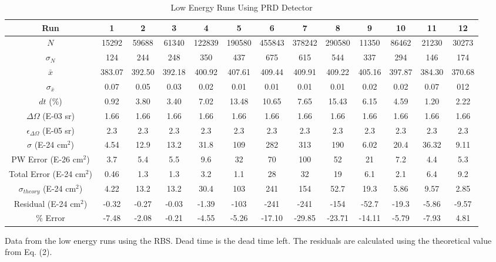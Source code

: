 \documentclass[10pt]{IEEEtran}
\begin{document}
    
    \begin{table}[!hbt]
        \begin{center}
        \caption{Low Energy Runs Using PRD Detector}
        \label{tab:lowPRD}
        \begin{tabular}{|c|cccccccccccc|}
            \hline
		   Run & 1 & 2 & 3 & 4 & 5 & 6 & 7 & 8 & 9 & 10 & 11 & 12 \\ 
		   \hline       \hline     
            $N$ & 15292 & 59688 & 61340 & 122839 & 190580 & 455843 & 378242 & 290580 & 11350 & 86462 & 21230 & 30273 \\
		   \hline  
            $\sigma_N$ & 124 & 244 & 248 & 350 & 437 & 675 & 615 & 544 & 337 & 294 & 146 & 174 \\
            \hline
            $\bar{x}$ & 383.07 & 392.50 & 392.18 & 400.92 & 407.61 & 409.44 & 409.91 & 409.22 & 405.16 & 397.87 & 384.30 & 370.68 \\
            \hline
            $\sigma_{\bar{x}}$ & 0.07 & 0.05 & 0.03 & 0.02 & 0.01 &  0.01 & 0.01 & 0.01 & 0.02 & 0.02 & 0.07 & 012 \\
		   \hline
            $dt$ (\%) & 0.92 & 3.80 & 3.40 & 7.02 & 13.48 & 10.65 & 7.65 & 15.43 & 6.15 & 4.59 & 1.20 & 2.22 \\
			\hline            
			$\Delta\Omega$ (E-03 sr) & 1.66 & 1.66 & 1.66 & 1.66 & 1.66 & 1.66 & 1.66 & 1.66 & 1.66 & 1.66 & 1.66 & 1.66 \\
			\hline
			$\epsilon_{\Delta\Omega}$ (E-05 sr) & 2.3 & 2.3 & 2.3 & 2.3 & 2.3 & 2.3 & 2.3 & 2.3 & 2.3 & 2.3 & 2.3 & 2.3\\
			\hline
			$\sigma $ (E-24 cm$^2$)& 4.54 & 12.9 & 13.2 & 31.8 & 109 & 282 & 313 & 190 & 6.02 & 20.4 & 36.32 & 9.11 \\
			\hline
			PW Error (E-26 cm$^2$) & 3.7 & 5.4 & 5.5 & 9.6 & 32 & 70 & 100 & 52 & 21 & 7.2 & 4.4 & 5.3 \\
			\hline
			Total Error (E-24 cm$^2$)& 0.46 & 1.3 & 1.3 & 3.2 & 1.1 & 28 & 32 & 19 & 6.1 & 2.1 & 6.4 & 9.2 \\
		    \hline
		    $\sigma_{theory}$ (E-24 cm$^2$) & 4.22 & 13.2 & 13.2 & 30.4 & 103 & 241 & 154 & 52.7 & 19.3 & 5.86 & 9.57 & 2.85 \\
		    \hline
		    Residual (E-24 cm$^2$) & -0.32 & -0.27 & -0.03 & -1.39 & -103 & -241 & -241 & -154 & -52.7 & -19.3 & -5.86 & -9.57 \\
		    \hline 
		    \% Error & -7.48 & -2.08 & -0.21 & -4.55 & -5.26 & -17.10 & -29.85 & -23.71 & -14.11 & -5.79 & -7.93 & 4.81 \\
		    \hline
        \end{tabular}
        \end{center}
        Data from the low energy runs using the RBS. Dead time is the dead time left. The residuals are calculated using the theoretical value from Eq. (2).
    \end{table}     
\end{document}
